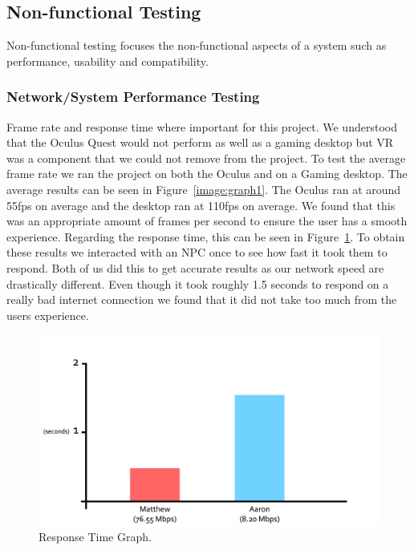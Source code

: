 \subsection{Non-functional Testing}
Non-functional testing focuses the non-functional aspects of a system such as performance, usability and compatibility.

\subsubsection{Network/System Performance Testing}
Frame rate and response time where important for this project. We understood that the Oculus Quest would not perform as well as a gaming desktop but VR was a component that we could not remove from the project. To test the average frame rate we ran the project on both the Oculus and on a Gaming desktop. The average results can be seen in Figure~\ref{image:graph1}. The Oculus ran at around 55fps on average and the desktop ran at 110fps on average. We found that this was an appropriate amount of frames per second to ensure the user has a smooth experience. Regarding the response time, this can be seen in Figure~\ref{image:graph}. To obtain these results we interacted with an NPC once to see how fast it took them to respond. Both of us did this to get accurate results as our network speed are drastically different. Even though it took roughly 1.5 seconds to respond on a really bad internet connection we found that it did not take too much from the users experience.

\begin{figure}[h!]
	\caption{Response Time Graph.}
	\label{image:graph}
	\centering
	\includegraphics[width=1\textwidth]{Images/barchart connection.png}
\end{figure}

